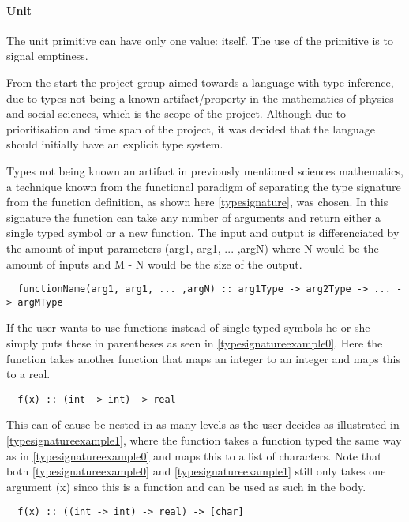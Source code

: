 \paragraph{Unit}
\label{sec:unit}

The unit primitive can have only one value: itself. The use of the primitive is to signal emptiness.

From the start the project group aimed towards a language with type inference, due to types not being a known artifact/property in the mathematics of physics and social sciences, which is the scope of the project. Although due to prioritisation and time span of the project, it was decided that the language should initially have an explicit type system.

Types not being known an artifact in previously mentioned sciences mathematics, a technique known from the functional paradigm of separating the type signature from the function definition, as shown here \cref{typesignature}, was chosen. In this signature the function can take any number of arguments and return either a single typed symbol or a new function. The input and output is differenciated by the amount of input parameters (arg1, arg1, ... ,argN) where N would be the amount of inputs and M - N would be the size of the output.

\begin{verbatim}
  functionName(arg1, arg1, ... ,argN) :: arg1Type -> arg2Type -> ... -> argMType
\end{verbatim}
\label{typesignature}

If the user wants to use functions instead of single typed symbols he or she simply puts these in parentheses as seen in \cref{typesignatureexample0}. Here the function takes another function that maps an integer to an integer and maps this to a real.

\begin{verbatim}
  f(x) :: (int -> int) -> real
\end{verbatim}
\label{typesignatureexample0}

This can of cause be nested in as many levels as the user decides as illustrated in \cref{typesignatureexample1}, where the function takes a function typed the same way as in \cref{typesignatureexample0} and maps this to a list of characters. Note that both \cref{typesignatureexample0} and \cref{typesignatureexample1} still only takes one argument (x) sinco this is a function and can be used as such in the body.

\begin{verbatim}
  f(x) :: ((int -> int) -> real) -> [char]
\end{verbatim}
\label{typesignatureexample1}

